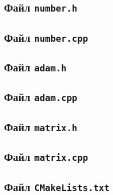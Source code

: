 \documentclass[a4paper,12pt]{article}
\begin{document}

\cleardoublepage

\subsection*{Файл {\tt  number.h}}\label{att2}


\cleardoublepage

\subsection*{Файл {\tt  number.cpp}}\label{att7}


\cleardoublepage

\subsection*{Файл {\tt adam.h}}\label{att3}


\cleardoublepage

\subsection*{Файл {\tt adam.cpp}}\label{att8}


\cleardoublepage

\subsection*{Файл {\tt matrix.h}}\label{att4}


\cleardoublepage

\subsection*{Файл {\tt matrix.cpp}}\label{att9}


\cleardoublepage

\subsection*{Файл {\tt CMakeLists.txt}}\label{att5}


\cleardoublepage
\end{document}
